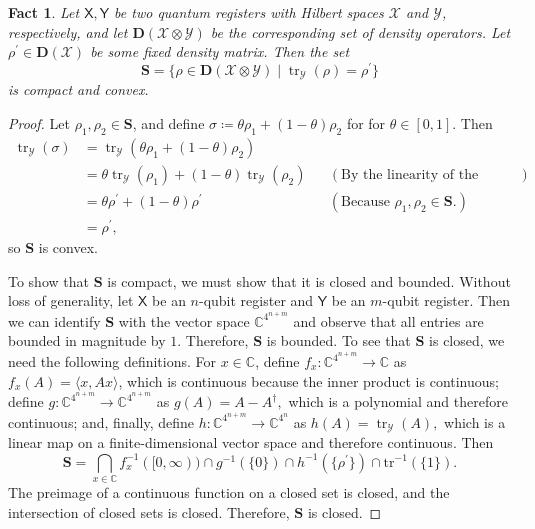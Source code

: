 \documentclass[10pt,a4paper]{article}
\newtheorem{fact}[theorem]{Fact}
\theoremstyle{definition}
\DeclareMathOperator{\tr}{tr}
\newcommand{\complex}{\mathbb C}
\newcommand{\C}{\complex}
\newcommand{\calX}{\mathcal{X}}
\newcommand{\calY}{\mathcal{Y}}
\newcommand{\qreg}[1]{\mathsf{#1}}
\begin{document}
\begin{fact}\label{fact:partial-trace-compact-convex}
Let $\qreg{X}, \qreg{Y}$ be two quantum registers with Hilbert spaces $\calX$ and $\calY$, respectively, and let $\mathbf{D}(\calX \otimes \calY)$ be the corresponding set of density operators. Let $\rho^\prime \in \mathbf{D}(\calX)$ be some fixed density matrix.
Then the set 
\[
\mathbf{S} = \{ \rho \in \mathbf{D}(\calX \otimes \calY) \mid \tr_\calY(\rho) = \rho^\prime \}
\]
is compact and convex.
\end{fact}
\begin{proof}
   Let $\rho_1, \rho_2 \in \mathbf{S}$, and define $\sigma \coloneqq \theta \rho_1 + (1-\theta) \rho_2$ for for $\theta \in [0,1]$. Then  
   \begin{align*}
       \tr_\calY(\sigma) 
       &= \tr_\calY(\theta \rho_1 + (1-\theta) \rho_2) \\
       &= \theta \tr_\calY(\rho_1) + (1-\theta) \tr_\calY(\rho_2) && (\text{By the linearity of the partial trace.}) \\
       &= \theta \rho^\prime + (1-\theta) \rho^\prime && (\text{Because $\rho_1, \rho_2 \in \mathbf{S}$.}) \\
       &=  \rho^\prime,  
   \end{align*}
   so $\mathbf{S}$ is convex. 
   
To show that $\mathbf{S}$ is compact, we must show that it is closed and bounded.
Without loss of generality, let $\qreg{X}$ be an $n$-qubit register and $\qreg{Y}$ be an $m$-qubit register.
Then we can identify $\mathbf{S}$ with the vector space $\complex^{4^{n + m}}$ and observe that all entries are bounded in magnitude by $1$. Therefore, $\mathbf{S}$ is bounded.
To see that $\mathbf{S}$ is closed, we need the following definitions.
For $x \in \complex$, define $f_x: \complex^{4^{n+m}} \to \complex$ as 
$f_x(A) = \langle x, Ax \rangle$,
which is continuous because the inner product is continuous; 
define 
$g:\C^{4^{n + m}}\to\mathbb{C}^{4^{n +m}}$ as 
$g(A) = A - A^\dagger,$
which is a polynomial and therefore continuous;
and, finally, define $h:\C^{4^{n+m}}\to\mathbb{C}^{4^n}$ as 
$h(A) = \tr_\calY(A),$ which is a linear map on a finite-dimensional vector space and therefore continuous.
Then 
\[
\mathbf{S} = \bigcap_{x\in \mathbb{C}}f_x^{-1}([0,\infty))\cap g^{-1}(\{0\})\cap h^{-1}(\{\rho^\prime\})\cap\text{tr}^{-1}(\{1\}).
\]
The preimage of a continuous function on a closed set is closed, and the intersection of closed sets is closed. Therefore, $\mathbf{S}$ is closed. 
\end{proof}
\end{document}
